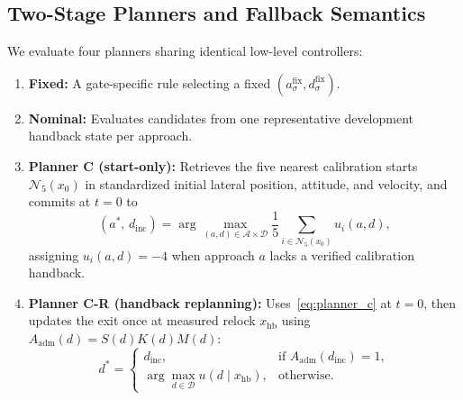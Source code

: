 \documentclass[letterpaper,10pt,conference]{ieeeconf}
\begin{document}
\subsection{Two-Stage Planners and Fallback Semantics}
We evaluate four planners sharing identical low-level controllers:
\begin{enumerate}
\item \textbf{Fixed:} A gate-specific rule selecting a fixed $(a^{\mathrm{fix}}_\sigma,d^{\mathrm{fix}}_\sigma)$.
\item \textbf{Nominal:} Evaluates candidates from one representative development handback state per approach.
\item \textbf{Planner C (start-only):} Retrieves the five nearest calibration starts $\mathcal{N}_5(x_0)$ in standardized initial lateral position, attitude, and velocity, and commits at $t=0$ to
\begin{equation}
  (a^*,\,d_{\mathrm{inc}}) = \arg\max_{(a,d)\in\mathcal{A}\times\mathcal{D}}
  \frac{1}{5}\sum_{i\in\mathcal{N}_5(x_0)} u_i(a,d),
  \label{eq:planner_c}
\end{equation}
assigning $u_i(a,d)=-4$ when approach $a$ lacks a verified calibration handback.
\item \textbf{Planner C-R (handback replanning):} Uses~\eqref{eq:planner_c} at $t=0$, then updates the exit once at measured relock $x_{\mathrm{hb}}$ using $A_{\mathrm{adm}}(d)=S(d)K(d)M(d)$:
\begin{equation}
  d^* = \begin{cases}
    d_{\mathrm{inc}}, & \text{if } A_{\mathrm{adm}}(d_{\mathrm{inc}})=1,\\
    \arg\max_{d\in\mathcal{D}} u(d\mid x_{\mathrm{hb}}), & \text{otherwise.}
  \end{cases}
  \label{eq:planner_cr}
\end{equation}
\end{enumerate}
\end{document}
